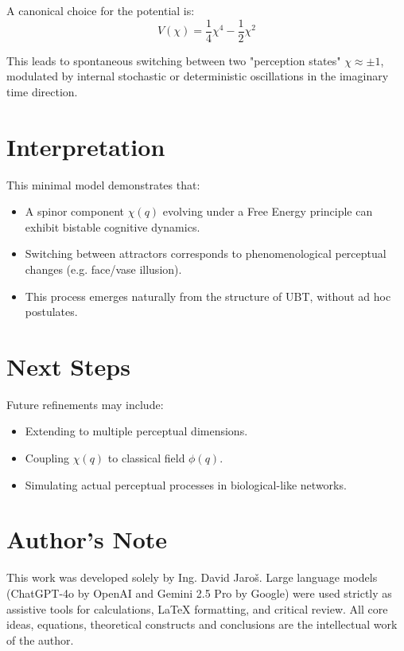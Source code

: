 \documentclass[12pt]{article}
\begin{document}
A canonical choice for the potential is:
\[
V(\chi) = \frac{1}{4} \chi^4 - \frac{1}{2} \chi^2
\]

This leads to spontaneous switching between two "perception states" \(\chi \approx \pm 1\), modulated by internal stochastic or deterministic oscillations in the imaginary time direction.

\section{Interpretation}
This minimal model demonstrates that:
\begin{itemize}
    \item A spinor component \(\chi(q)\) evolving under a Free Energy principle can exhibit bistable cognitive dynamics.
    \item Switching between attractors corresponds to phenomenological perceptual changes (e.g. face/vase illusion).
    \item This process emerges naturally from the structure of UBT, without ad hoc postulates.
\end{itemize}

\section{Next Steps}
Future refinements may include:
\begin{itemize}
    \item Extending to multiple perceptual dimensions.
    \item Coupling \(\chi(q)\) to classical field \(\phi(q)\).
    \item Simulating actual perceptual processes in biological-like networks.
\end{itemize}


\section*{Author's Note}

This work was developed solely by Ing. David Jaroš.  
Large language models (ChatGPT-4o by OpenAI and Gemini 2.5 Pro by Google) were used strictly as assistive tools for calculations, LaTeX formatting, and critical review.  
All core ideas, equations, theoretical constructs and conclusions are the intellectual work of the author.
\end{document}
